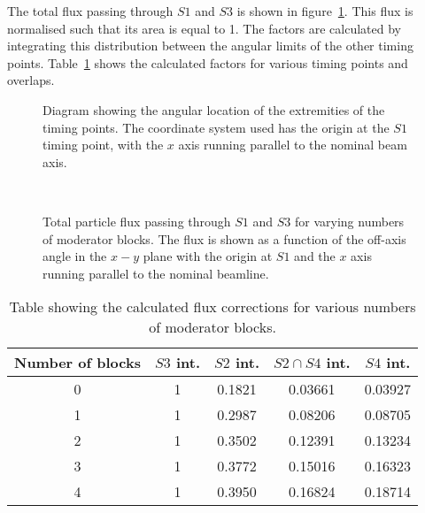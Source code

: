 	\begin{figure}[h]
		
	\end{figure}
		
	The total flux passing through $S1$ and $S3$ is shown in figure~\ref{fig:s1s3all}.
	This flux is normalised such that its area is equal to 1.
	The factors are calculated by integrating this distribution between the angular limits of the other timing points.
	Table~\ref{tab:fluxFactors} shows the calculated factors for various timing points and overlaps.
	
	\begin{figure}[h]
		\begin{minipage}{0.49\textwidth}
			\begin{adjustbox}{max totalsize={\textwidth}{.5\textheight}}
				
			\end{adjustbox}
			\centering
			\caption{Diagram showing the angular location of the extremities of the timing points. The coordinate system used has the origin at the $S1$ timing point, with the $x$ axis running parallel to the nominal beam axis.}
			\label{fig:beamAng}
		\end{minipage}
		\hfill
		\begin{minipage}{0.49\textwidth}
			\begin{adjustbox}{max totalsize={\textwidth}{0.5\textheight}, center}
				
			\end{adjustbox}
			\caption{Total particle flux passing through $S1$ and $S3$ for varying numbers of moderator blocks. The flux is shown as a function of the off-axis angle in the $x-y$ plane with the origin at $S1$ and the $x$ axis running parallel to the nominal beamline.}
			\label{fig:s1s3all}
		\end{minipage}
		\
	\end{figure}
		
	\begin{table}
		\centering
		\begin{tabular}{|c|c|c|c|c|}
			\hline
			Number of blocks & $S3$ int. & $S2$ int. & $S2 \cap S4$ int. & $S4$ int. \\
			\hline
			0 & 1 & 0.1821 & 0.03661 & 0.03927 \\
			1 & 1 & 0.2987 & 0.08206 & 0.08705 \\
			2 & 1 & 0.3502 & 0.12391 & 0.13234 \\
			3 & 1 & 0.3772 & 0.15016 & 0.16323 \\
			4 & 1 & 0.3950 & 0.16824 & 0.18714 \\
			\hline		
		\end{tabular}
		\caption{Table showing the calculated flux corrections for various numbers of moderator blocks.}
		\label{tab:fluxFactors}
	\end{table}
	